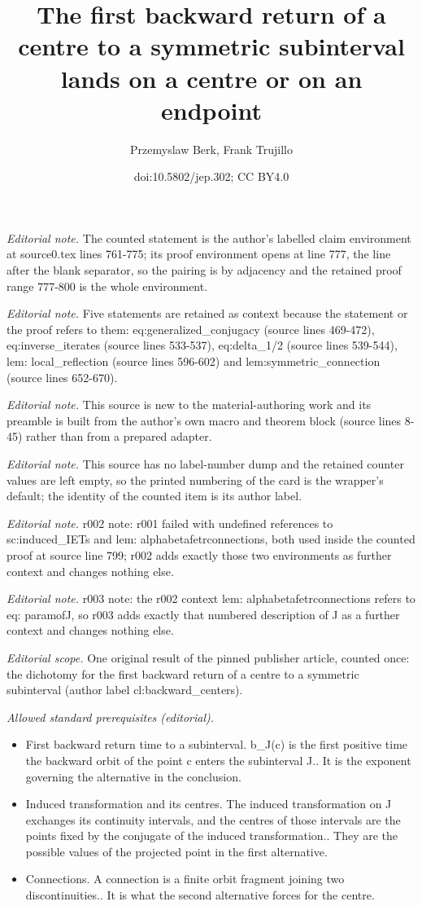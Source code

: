 \documentclass[10pt,a4paper]{article}
\title{The first backward return of a centre to a symmetric subinterval lands on a centre or on an endpoint}
\author{Przemyslaw Berk, Frank Trujillo}
\date{doi:10.5802/jep.302; CC BY4.0}
\theoremstyle{plain}
\theoremstyle{definition}
\begin{document}
\maketitle
\noindent\textit{Editorial note.} The counted statement is the author's labelled claim environment at source0.tex lines 761-775; its proof environment opens at line 777, the line after the blank separator, so the pairing is by adjacency and the retained proof range 777-800 is the whole environment.\par\medskip
\noindent\textit{Editorial note.} Five statements are retained as context because the statement or the proof refers to them: eq:generalized\_conjugacy (source lines 469-472), eq:inverse\_iterates (source lines 533-537), eq:delta\_1/2 (source lines 539-544), lem: local\_reflection (source lines 596-602) and lem:symmetric\_connection (source lines 652-670).\par\medskip
\noindent\textit{Editorial note.} This source is new to the material-authoring work and its preamble is built from the author's own macro and theorem block (source lines 8-45) rather than from a prepared adapter.\par\medskip
\noindent\textit{Editorial note.} This source has no label-number dump and the retained counter values are left empty, so the printed numbering of the card is the wrapper's default; the identity of the counted item is its author label.\par\medskip
\noindent\textit{Editorial note.} r002 note: r001 failed with undefined references to sc:induced\_IETs and lem: alphabetafetrconnections, both used inside the counted proof at source line 799; r002 adds exactly those two environments as further context and changes nothing else.\par\medskip
\noindent\textit{Editorial note.} r003 note: the r002 context lem: alphabetafetrconnections refers to eq: paramofJ, so r003 adds exactly that numbered description of J as a further context and changes nothing else.\par\medskip
\noindent\textit{Editorial scope.} One original result of the pinned publisher article, counted once: the dichotomy for the first backward return of a centre to a symmetric subinterval (author label cl:backward\_centers).\par\medskip
\noindent\textit{Allowed standard prerequisites (editorial).}\begin{itemize}
\item First backward return time to a subinterval. b\_J(c) is the first positive time the backward orbit of the point c enters the subinterval J.. It is the exponent governing the alternative in the conclusion.
\item Induced transformation and its centres. The induced transformation on J exchanges its continuity intervals, and the centres of those intervals are the points fixed by the conjugate of the induced transformation.. They are the possible values of the projected point in the first alternative.
\item Connections. A connection is a finite orbit fragment joining two discontinuities.. It is what the second alternative forces for the centre.
\end{itemize}\medskip
\end{document}
